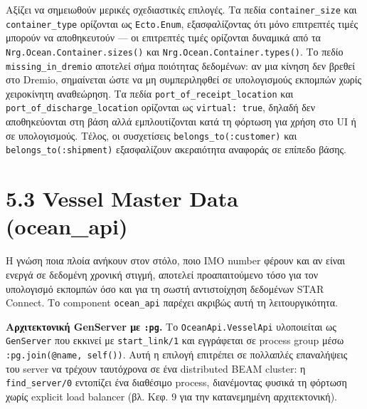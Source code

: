 \begin{Shaded}
\begin{Highlighting}[]
\FunctionTok{(}\NormalTok{, }\FunctionTok{)}
\FunctionTok{(}\NormalTok{, }\FunctionTok{)}

\FunctionTok{(}\NormalTok{, }\NormalTok{, } \FunctionTok{)}
\FunctionTok{(}\NormalTok{, }\NormalTok{, } \FunctionTok{)}
\end{Highlighting}
\end{Shaded}

Αξίζει να σημειωθούν μερικές σχεδιαστικές επιλογές. Τα πεδία
\texttt{container\_size} και \texttt{container\_type} ορίζονται ως
\texttt{Ecto.Enum}, εξασφαλίζοντας ότι μόνο επιτρεπτές τιμές μπορούν να
αποθηκευτούν --- οι επιτρεπτές τιμές ορίζονται δυναμικά από τα
\texttt{Nrg.Ocean.Container.sizes()} και
\texttt{Nrg.Ocean.Container.types()}. Το πεδίο
\texttt{missing\_in\_dremio} αποτελεί σήμα ποιότητας δεδομένων: αν μια
κίνηση δεν βρεθεί στο Dremio, σημαίνεται ώστε να μη συμπεριληφθεί σε
υπολογισμούς εκπομπών χωρίς χειροκίνητη αναθεώρηση. Τα πεδία
\texttt{port\_of\_receipt\_location} και
\texttt{port\_of\_discharge\_location} ορίζονται ως
\texttt{virtual:\ true}, δηλαδή δεν αποθηκεύονται στη βάση αλλά
εμπλουτίζονται κατά τη φόρτωση για χρήση στο UI ή σε υπολογισμούς.
Τέλος, οι συσχετίσεις \texttt{belongs\_to(:customer)} και
\texttt{belongs\_to(:shipment)} εξασφαλίζουν ακεραιότητα αναφοράς σε
επίπεδο βάσης.

\section{5.3 Vessel Master Data
(ocean\_api)}\label{vessel-master-data-ocean_api}

Η γνώση ποια πλοία ανήκουν στον στόλο, ποιο IMO number φέρουν και αν
είναι ενεργά σε δεδομένη χρονική στιγμή, αποτελεί προαπαιτούμενο τόσο
για τον υπολογισμό εκπομπών όσο και για τη σωστή αντιστοίχηση δεδομένων
STAR Connect. Το component \texttt{ocean\_api} παρέχει ακριβώς αυτή τη
λειτουργικότητα.

\textbf{Αρχιτεκτονική GenServer με \texttt{:pg}.} Το
\texttt{OceanApi.VesselApi} υλοποιείται ως \texttt{GenServer} που
εκκινεί με \texttt{start\_link/1} και εγγράφεται σε process group μέσω
\texttt{:pg.join(@name,\ self())}. Αυτή η επιλογή επιτρέπει σε πολλαπλές
επαναλήψεις του server να τρέχουν ταυτόχρονα σε ένα distributed BEAM
cluster: η \texttt{find\_server/0} εντοπίζει ένα διαθέσιμο process,
διανέμοντας φυσικά τη φόρτωση χωρίς explicit load balancer (βλ. Κεφ. 9
για την κατανεμημένη αρχιτεκτονική).

